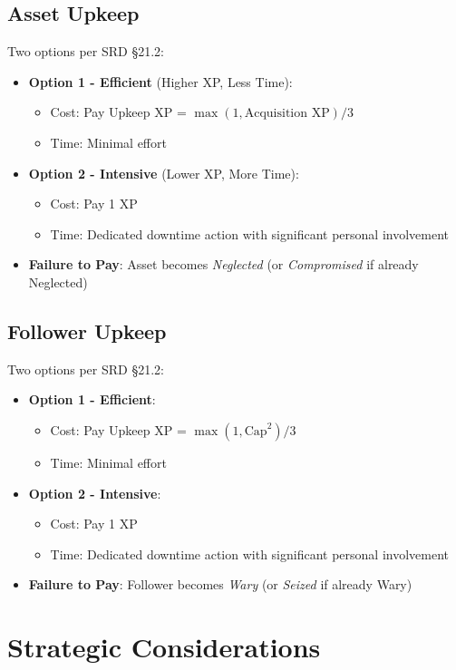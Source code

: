\subsection*{Asset Upkeep}
Two options per SRD §21.2:
\begin{itemize}
\item \textbf{Option 1 - Efficient} (Higher XP, Less Time): 
      \begin{itemize}
      \item Cost: Pay Upkeep XP = $\max(1, \text{Acquisition XP})/3$
      \item Time: Minimal effort
      \end{itemize}
\item \textbf{Option 2 - Intensive} (Lower XP, More Time):
      \begin{itemize}
      \item Cost: Pay 1 XP
      \item Time: Dedicated downtime action with significant personal involvement
      \end{itemize}
\item \textbf{Failure to Pay}: Asset becomes \emph{Neglected} (or \emph{Compromised} if already Neglected)
\end{itemize}

\subsection*{Follower Upkeep}
Two options per SRD §21.2:
\begin{itemize}
\item \textbf{Option 1 - Efficient}: 
      \begin{itemize}
      \item Cost: Pay Upkeep XP = $\max(1, \text{Cap}^2)/3$ 
      \item Time: Minimal effort
      \end{itemize}
\item \textbf{Option 2 - Intensive}:
      \begin{itemize}
      \item Cost: Pay 1 XP
      \item Time: Dedicated downtime action with significant personal involvement
      \end{itemize}
\item \textbf{Failure to Pay}: Follower becomes \emph{Wary} (or \emph{Seized} if already Wary)
\end{itemize}

\section{Strategic Considerations}

